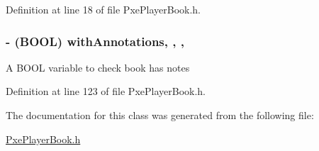 Definition at line 18 of file Pxe\-Player\-Book.\-h.

\hypertarget{interface_pxe_player_book_a1c5d347398ddb5ab9b4b5b0a322f1d40}{
\subsubsection[{with\-Annotations}]{\setlength{\rightskip}{0pt plus 5cm}-\/ (B\-O\-O\-L) with\-Annotations\hspace{0.3cm}{\ttfamily [read]}, {\ttfamily [write]}, {\ttfamily [nonatomic]}, {\ttfamily [assign]}}}\label{interface_pxe_player_book_a1c5d347398ddb5ab9b4b5b0a322f1d40}
A B\-O\-O\-L variable to check book has notes 

Definition at line 123 of file Pxe\-Player\-Book.\-h.



The documentation for this class was generated from the following file\-:\begin{DoxyCompactItemize}
\item 
\hyperlink{_pxe_player_book_8h}{Pxe\-Player\-Book.\-h}\end{DoxyCompactItemize}
